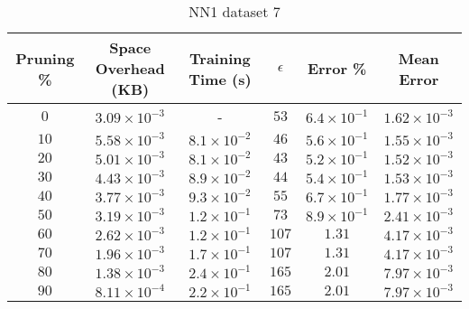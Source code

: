 \begin{adjustwidth}{0cm}{}
\begin{table}
\caption{NN1 dataset 7}\label{pr17}
\begin{tabular}{cccccc}
\hline
\toprule
Pruning \% & Space Overhead (KB) & Training Time (s) & $\epsilon$ & Error \% & Mean Error\\
\midrule
$0$ & $3.09 \times 10^{-3}$ & - & $53$ & $6.4 \times 10^{-1}$ & $1.62 \times 10^{-3}$\\
$10$ & $5.58 \times 10^{-3}$ & $8.1 \times 10^{-2}$ & $46$ & $5.6 \times 10^{-1}$ & $1.55 \times 10^{-3}$\\
$20$ & $5.01 \times 10^{-3}$ & $8.1 \times 10^{-2}$ & $43$ & $5.2 \times 10^{-1}$ & $1.52 \times 10^{-3}$\\
$30$ & $4.43 \times 10^{-3}$ & $8.9 \times 10^{-2}$ & $44$ & $5.4 \times 10^{-1}$ & $1.53 \times 10^{-3}$\\
$40$ & $3.77 \times 10^{-3}$ & $9.3 \times 10^{-2}$ & $55$ & $6.7 \times 10^{-1}$ & $1.77 \times 10^{-3}$\\
$50$ & $3.19 \times 10^{-3}$ & $1.2 \times 10^{-1}$ & $73$ & $8.9 \times 10^{-1}$ & $2.41 \times 10^{-3}$\\
$60$ & $2.62 \times 10^{-3}$ & $1.2 \times 10^{-1}$ & $107$ & $1.31$ & $4.17 \times 10^{-3}$\\
$70$ & $1.96 \times 10^{-3}$ & $1.7 \times 10^{-1}$ & $107$ & $1.31$ & $4.17 \times 10^{-3}$\\
$80$ & $1.38 \times 10^{-3}$ & $2.4 \times 10^{-1}$ & $165$ & $2.01$ & $7.97 \times 10^{-3}$\\
$90$ & $8.11 \times 10^{-4}$ & $2.2 \times 10^{-1}$ & $165$ & $2.01$ & $7.97 \times 10^{-3}$\\
\bottomrule
\end{tabular}
\end{table}
\end{adjustwidth}

\par\null\par

